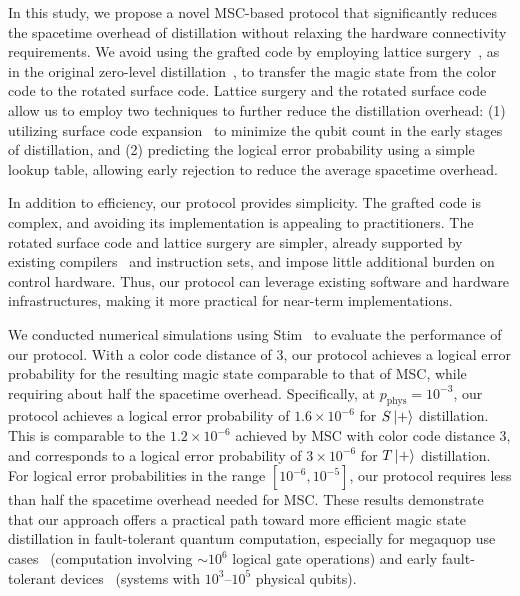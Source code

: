 In this study, we propose a novel MSC-based protocol that significantly reduces the spacetime overhead of distillation without relaxing the hardware connectivity requirements.
We avoid using the grafted code by employing lattice surgery~\cite{Horsman2012, poulsen2017fault}, as in the original zero-level distillation~\cite{itogawa2025efficient}, to transfer the magic state from the color code to the rotated surface code.
Lattice surgery and the rotated surface code allow us to employ two techniques to further reduce the distillation overhead:
(1) utilizing surface code expansion~\cite{li2015magic} to minimize the qubit count in the early stages of distillation, and (2) predicting the logical error probability using a simple lookup table, allowing early rejection to reduce the average spacetime overhead.

In addition to efficiency, our protocol provides simplicity.
The grafted code is complex, and avoiding its implementation is appealing to practitioners.
The rotated surface code and lattice surgery are simpler, already supported by existing compilers~\cite{Watkins2023High} and instruction sets, and impose little additional burden on control hardware.
Thus, our protocol can leverage existing software and hardware infrastructures, making it more practical for near-term implementations.

We conducted numerical simulations using Stim~\cite{gidney2021stim} to evaluate the performance of our protocol.
With a color code distance of 3, our protocol achieves a logical error probability for the resulting magic state comparable to that of MSC, while requiring about half the spacetime overhead.
Specifically, at $p_\mathrm{phys} = 10^{-3}$, our protocol achieves a logical error probability of $1.6 \times 10^{-6}$ for $S\ket{+}$ distillation.
This is comparable to the $1.2 \times 10^{-6}$ achieved by MSC with color code distance 3, and corresponds to a logical error probability of $3 \times 10^{-6}$ for $T\ket{+}$ distillation.
For logical error probabilities in the range $[10^{-6}, 10^{-5}]$, our protocol requires less than half the spacetime overhead needed for MSC.
These results demonstrate that our approach offers a practical path toward more efficient magic state distillation in fault-tolerant quantum computation, especially for megaquop use cases~\cite{preskill2025beyond} (computation involving $\sim 10^{6}$ logical gate operations) and early fault-tolerant devices~\cite{akahoshi2024partially,toshio2025practical, akahoshi2024compilation} (systems with $10^3$--$10^5$ physical qubits).

